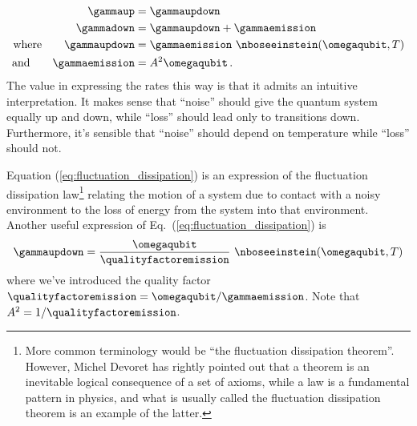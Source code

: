\begin{align}
  \gammaup &= \gammaupdown \\
  \gammadown &= \gammaupdown + \gammaemission \\
  \text{where} \qquad
  \gammaupdown &= \gammaemission ~ \nboseeinstein(\omegaqubit, T) \label{eq:fluctuation_dissipation} \\
  \text{and} \qquad
  \gammaemission &= A^2 \omegaqubit
  \, .
\end{align}
The value in expressing the rates this way is that it admits an intuitive interpretation.
It makes sense that ``noise'' should give the quantum system equally up and down, while ``loss'' should lead only to transitions down.
Furthermore, it's sensible that ``noise'' should depend on temperature while ``loss'' should not.

Equation (\ref{eq:fluctuation_dissipation}) is an expression of the fluctuation dissipation law\footnote{More common terminology would be ``the fluctuation dissipation theorem''. However, Michel Devoret has rightly pointed out that a theorem is an inevitable logical consequence of a set of axioms, while a law is a fundamental pattern in physics, and what is usually called the fluctuation dissipation theorem is an example of the latter.} relating the motion of a system due to contact with a noisy environment to the loss of energy from the system into that environment.
Another useful expression of Eq.~(\ref{eq:fluctuation_dissipation}) is
\begin{equation}
  \gammaupdown = \frac{\omegaqubit}{\qualityfactoremission} ~ \nboseeinstein(\omegaqubit, T)
  \label{eq:fluctuation_dissipation_quality_factor}
\end{equation}
where we've introduced the quality factor $\qualityfactoremission = \omegaqubit / \gammaemission$.
Note that $A^2 = 1 / \qualityfactoremission$.
